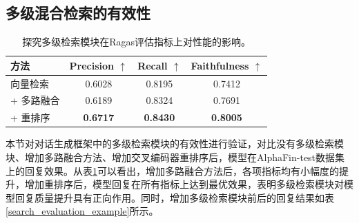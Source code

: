 

\subsection{多级混合检索的有效性}

\begin{table}
	\caption{\label{search_module_evaluation}探究多级检索模块在Ragas评估指标上对性能的影响。}
	\centering{}%
	\small 
	\begin{tabular}{lccc}
		\toprule[2pt]
		方法 & Precision $\uparrow$ & Recall $\uparrow$ & Faithfulness $\uparrow$ \\
		\hline
		向量检索 & 0.6028 & 0.8195 & 0.7412 \\
		+ 多路融合 & 0.6189 & 0.8324 & 0.7691 \\
		+ 重排序 & \textbf{0.6717} & \textbf{0.8430} & \textbf{0.8005} \\
		\bottomrule[2pt]
	\end{tabular}
\end{table}

本节对对话生成框架中的多级检索模块的有效性进行验证，对比没有多级检索模块、增加多路融合方法、增加交叉编码器重排序后，模型在AlphaFin-test数据集上的回复效果。从表\ref{search_module_evaluation}可以看出，增加多路融合方法后，各项指标均有小幅度的提升，增加重排序后，模型回复在所有指标上达到最优效果，表明多级检索模块对模型回复质量提升具有正向作用。同时，增加多级检索模块前后的回复结果如表\ref{search_evaluation_example}所示。

